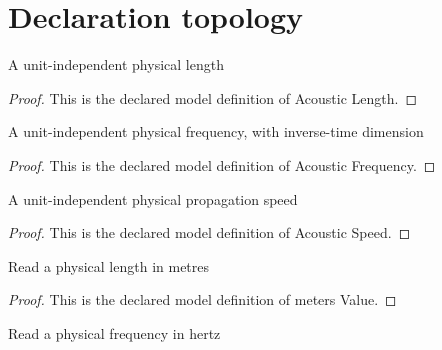 \section{Declaration topology}
\begin{definition}
  \label{def:physics:phyx-mini-0170:phyxminiproblems-problemphyxmini0170-acousticlength}
  A unit-independent physical length
\end{definition}
\begin{proof}
  This is the declared model definition of Acoustic Length.
\end{proof}
\begin{definition}
  \label{def:physics:phyx-mini-0170:phyxminiproblems-problemphyxmini0170-acousticfrequency}
  A unit-independent physical frequency, with inverse-time dimension
\end{definition}
\begin{proof}
  This is the declared model definition of Acoustic Frequency.
\end{proof}
\begin{definition}
  \label{def:physics:phyx-mini-0170:phyxminiproblems-problemphyxmini0170-acousticspeed}
  A unit-independent physical propagation speed
\end{definition}
\begin{proof}
  This is the declared model definition of Acoustic Speed.
\end{proof}
\begin{definition}
  \label{def:physics:phyx-mini-0170:phyxminiproblems-problemphyxmini0170-metersvalue}
  Read a physical length in metres
\end{definition}
\begin{proof}
  This is the declared model definition of meters Value.
\end{proof}
\begin{definition}
  \label{def:physics:phyx-mini-0170:phyxminiproblems-problemphyxmini0170-hertzvalue}
  Read a physical frequency in hertz
\end{definition}
